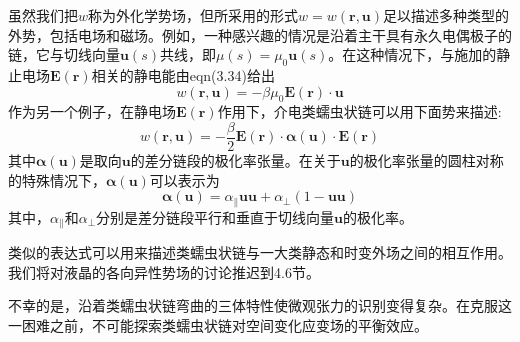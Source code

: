 虽然我们把$w$称为外化学势场，但所采用的形式$w=w(\mathbf{r},\mathbf{u})$足以描述多种类型的外势，包括电场和磁场。例如，一种感兴趣的情况是沿着主干具有永久电偶极子的链，它与切线向量$\mathbf{u}(s)$共线，即$\mu(s)=\mu_0\mathbf{u}(s)$。在这种情况下，与施加的静止电场$\mathbf{E}(\mathbf{r})$相关的静电能由eqn(3.34)给出
\begin{equation}
w(\mathbf{r},\mathbf{u})=-\beta\mu_0\mathbf{E}(\mathbf{r})\cdot\mathbf{u}
\end{equation}
作为另一个例子，在静电场$\mathbf{E}(\mathbf{r})$作用下，介电类蠕虫状链可以用下面势来描述:
\begin{equation}
w(\mathbf{r},\mathbf{u})=-\frac{\beta}{2}\mathbf{E}(\mathbf{r})\cdot\boldsymbol{\alpha}(\mathbf{u})\cdot\mathbf{E}(\mathbf{r})
\end{equation}
其中$\boldsymbol{\alpha}(\mathbf{u})$是取向$\mathbf{u}$的差分链段的极化率张量。在关于$\mathbf{u}$的极化率张量的圆柱对称的特殊情况下，$\boldsymbol{\alpha}(\mathbf{u})$可以表示为
\begin{equation}
\boldsymbol{\alpha}(\mathbf{u})=\alpha_{\parallel}\mathbf{u}\mathbf{u}+\alpha_{\perp}(1-\mathbf{u}\mathbf{u})
\end{equation}
其中，$\alpha_{\parallel}$和$\alpha_{\perp}$分别是差分链段平行和垂直于切线向量$\mathbf{u}$的极化率。

类似的表达式可以用来描述类蠕虫状链与一大类静态和时变外场之间的相互作用。我们将对液晶的各向异性势场的讨论推迟到4.6节。

不幸的是，沿着类蠕虫状链弯曲的三体特性使微观张力的识别变得复杂。在克服这一困难之前，不可能探索类蠕虫状链对空间变化应变场的平衡效应。
